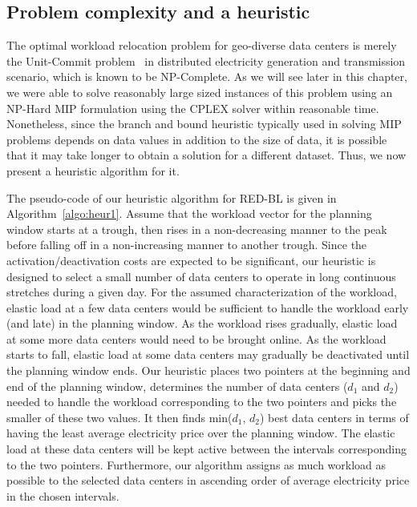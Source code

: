 \subsection{Problem complexity and a heuristic}
\label{subsec:complexityheur} The optimal workload relocation problem for geo-diverse data centers is merely the Unit-Commit problem~\cite{unitcommit-trans} in distributed
electricity generation and transmission scenario, which is known to be NP-Complete. As we will see later in this chapter, we were able to solve reasonably large sized instances of this problem using an NP-Hard MIP formulation using the CPLEX solver within reasonable time. Nonetheless, since the branch and bound heuristic typically used in solving MIP problems depends on data values in addition to the size of data, it is possible that it may take longer to obtain a solution for a different dataset. Thus, we now present a heuristic algorithm for it.

The pseudo-code of our heuristic algorithm for RED-BL is given in Algorithm~\ref{algo:heur1}. Assume that the workload vector for the planning window starts at a trough, then rises in a non-decreasing manner to the peak before falling off in a non-increasing manner to another trough. Since the activation/deactivation costs are expected to be significant, our heuristic is designed to select a small number of data centers to operate in long continuous stretches during a given day. For the assumed characterization of the workload, elastic load at a few data centers would be sufficient to handle the workload early (and late) in the planning window. As the workload rises gradually, elastic load at some more data centers would need to be brought online. As the workload starts to fall, elastic load at some data centers may gradually be deactivated until the planning window ends. Our heuristic places two pointers at the beginning and end of the planning window, determines the number of data centers ($d_1$ and $d_2$) needed to handle the workload corresponding to the two pointers and picks the smaller of these two values. It then finds min($d_1$, $d_2$) best data centers in terms of having the least average electricity price over the planning window. The elastic load at these data centers will be kept active between the intervals corresponding to the two pointers. Furthermore, our algorithm assigns as much workload as possible to the selected data centers in ascending order of average electricity price in the chosen intervals. 

